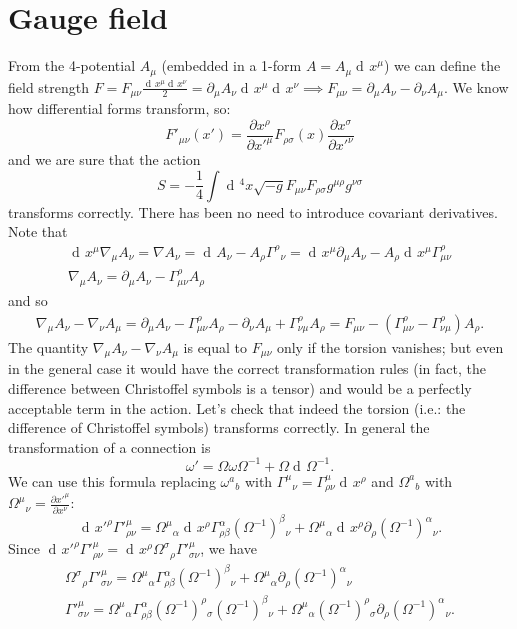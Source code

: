 \documentclass[a4paper,12pt]{book}
\newcommand{\dd}{\mathop{\mathrm{d}\!}{}}
\theoremstyle{definition}
\theoremstyle{remark}
\begin{document}
\section{Gauge field}
From the 4-potential $A_\mu$ (embedded in a 1-form $A=A_\mu\dd x^\mu$) we can define the field strength $F=F_{\mu\nu}\frac{\dd x^\mu\dd x^\nu}{2}=\partial_\mu A_\nu\dd x^\mu\dd x^\nu\implies F_{\mu\nu}=\partial_\mu A_\nu-\partial_\nu A_\mu$. We know how differential forms transform, so:
\[F'_{\mu\nu}(x')=\frac{\partial x^\rho}{\partial x'^\mu}F_{\rho\sigma}(x)\frac{\partial x^\sigma}{\partial x'^\nu}\]
and we are sure that the action
\[S=-\frac{1}{4}\int\dd^4x\sqrt{-g}F_{\mu\nu}F_{\rho\sigma}g^{\mu\rho}g^{\nu\sigma}\]
transforms correctly. There has been no need to introduce covariant derivatives. Note that
\begin{gather*}\dd x^\mu\nabla_\mu A_\nu=\nabla A_\nu=\dd A_\nu-A_\rho\Gamma^\rho{}_\nu=\dd x^\mu\partial_\mu A_\nu-A_\rho\dd x^\mu\Gamma_{\mu\nu}^\rho\\
\nabla_\mu A_\nu=\partial_\mu A_\nu-\Gamma_{\mu\nu}^\rho A_\rho
\end{gather*}
and so
\begin{gather*}
\nabla_\mu A_\nu-\nabla_\nu A_\mu=\partial_\mu A_\nu-\Gamma_{\mu\nu}^\rho A_\rho-\partial_\nu A_\mu+\Gamma_{\nu\mu}^\rho A_\rho=F_{\mu\nu}-(\Gamma_{\mu\nu}^\rho-\Gamma_{\nu\mu}^\rho)A_\rho.
\end{gather*}
The quantity $\nabla_\mu A_\nu-\nabla_\nu A_\mu$ is equal to $F_{\mu\nu}$ only if the torsion vanishes; but even in the general case it would have the correct transformation rules (in fact, the difference between Christoffel symbols is a tensor) and would be a perfectly acceptable term in the action. Let's check that indeed the torsion (i.e.: the difference of Christoffel symbols) transforms correctly. In general the transformation of a connection is
\[\omega'=\Omega\omega\Omega^{-1}+\Omega\dd\Omega^{-1}.\]
We can use this formula replacing $\omega^a{}_b$ with $\Gamma^\mu{}_\nu=\Gamma^\mu_{\rho\nu}\dd x^\rho$ and $\Omega^a{}_b$ with $\Omega^\mu{}_\nu=\frac{\partial x'^\mu}{\partial x^\nu}$:
\[\dd x'^\rho\Gamma'^\mu_{\rho\nu}=\Omega^\mu{}_\alpha\dd x^\rho\Gamma^\alpha_{\rho\beta}(\Omega^{-1})^\beta{}_\nu+\Omega^\mu{}_\alpha\dd x^\rho\partial_\rho(\Omega^{-1})^\alpha{}_\nu.\]
Since $\dd x'^\rho\Gamma'^\mu_{\rho\nu}=\dd x^\rho\Omega^\sigma{}_\rho\Gamma'^\mu_{\sigma\nu}$, we have
\begin{gather*}
\Omega^\sigma{}_\rho\Gamma'^\mu_{\sigma\nu}=\Omega^\mu{}_\alpha\Gamma^\alpha_{\rho\beta}(\Omega^{-1})^\beta{}_\nu+\Omega^\mu{}_\alpha\partial_\rho(\Omega^{-1})^\alpha{}_\nu\\
\Gamma'^\mu_{\sigma\nu}=\Omega^\mu{}_\alpha\Gamma^\alpha_{\rho\beta}(\Omega^{-1})^\rho{}_\sigma(\Omega^{-1})^\beta{}_\nu+\Omega^\mu{}_\alpha(\Omega^{-1})^\rho{}_\sigma\partial_\rho(\Omega^{-1})^\alpha{}_\nu.
\end{gather*}
\end{document}
